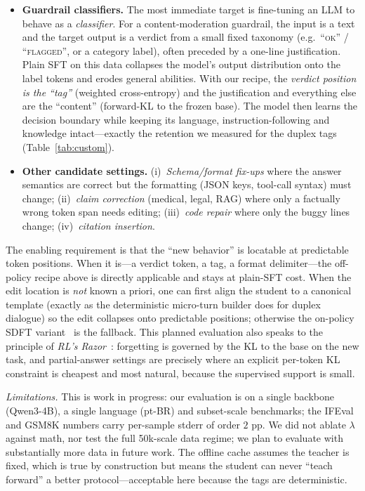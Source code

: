 \documentclass[conference]{IEEEtran}
\begin{document}
\begin{itemize}
  \item \textbf{Guardrail classifiers.} The most immediate target is fine-tuning an
        LLM to behave as a \emph{classifier}. For a content-moderation guardrail, the
        input is a text and the target output is a verdict from a small fixed
        taxonomy (e.g.\ ``\textsc{ok}'' / ``\textsc{flagged}'', or a category label),
        often preceded by a one-line justification. Plain SFT on this data collapses
        the model's output distribution onto the label tokens and erodes general
        abilities. With our recipe, the \emph{verdict position is the ``tag''} (weighted
        cross-entropy) and the justification and everything else are the ``content''
        (forward-KL to the frozen base). The model then learns the decision boundary
        while keeping its language, instruction-following and knowledge intact---exactly
        the retention we measured for the duplex tags (Table~\ref{tab:custom}).
  \item \textbf{Other candidate settings.} (i)~\emph{Schema/format fix-ups} where the
        answer semantics are correct but the formatting (JSON keys, tool-call syntax)
        must change; (ii)~\emph{claim correction} (medical, legal, RAG) where only a
        factually wrong token span needs editing; (iii)~\emph{code repair} where only
        the buggy lines change; (iv)~\emph{citation insertion}.
\end{itemize}

The enabling requirement is that the ``new behavior'' is locatable at predictable
token positions. When it is---a verdict token, a tag, a format delimiter---the
off-policy recipe above is directly applicable and stays at plain-SFT cost. When the
edit location is \emph{not} known a priori, one can first align the student to a
canonical template (exactly as the deterministic micro-turn builder does for duplex
dialogue) so the edit collapses onto predictable positions; otherwise the on-policy
SDFT variant~\cite{selfdistill2026} is the fallback. This planned evaluation also
speaks to the principle of \emph{RL's Razor}~\cite{rlsrazor2025}: forgetting is
governed by the KL to the base on the new task, and partial-answer settings are
precisely where an explicit per-token KL constraint is cheapest and most natural,
because the supervised support is small.

\emph{Limitations.} This is work in progress: our evaluation is on a single backbone
(Qwen3-4B), a single language (pt-BR) and subset-scale benchmarks; the IFEval and GSM8K
numbers carry per-sample stderr of order $2$ pp. We did not ablate $\lambda$ against
math, nor test the full 50k-scale data regime; we plan to evaluate with substantially
more data in future work. The offline cache assumes the teacher is fixed,
which is true by construction but means the student can never ``teach forward'' a
better protocol---acceptable here because the tags are deterministic.
\end{document}
